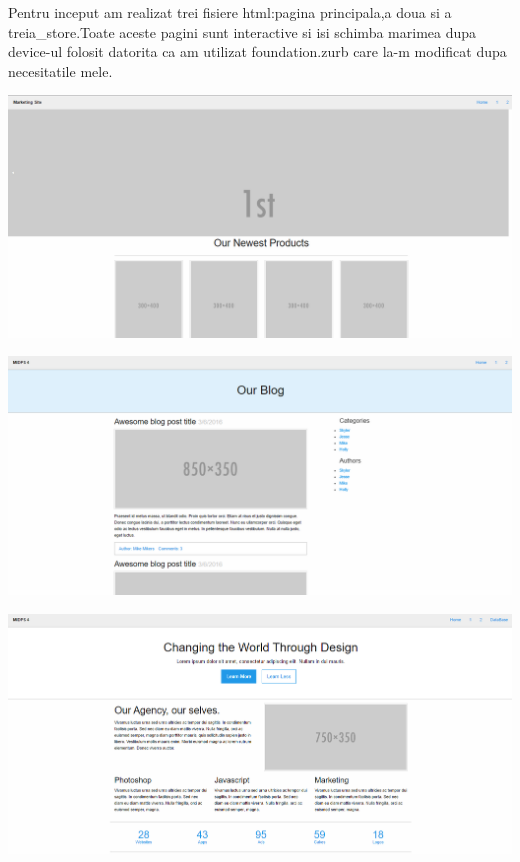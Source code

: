Pentru inceput am realizat trei fisiere html:pagina principala,a doua si a treia\_store.Toate aceste pagini sunt interactive si isi schimba marimea dupa device-ul folosit datorita ca am utilizat foundation.zurb care la-m modificat dupa necesitatile mele.
\begin{flushleft}
\includegraphics[scale=0.5]{images/2}
\end{flushleft}
\begin{flushleft}
\includegraphics[scale=0.5]{images/3}
\end{flushleft}
\begin{flushleft}
\includegraphics[scale=0.5]{images/4}
\end{flushleft}

